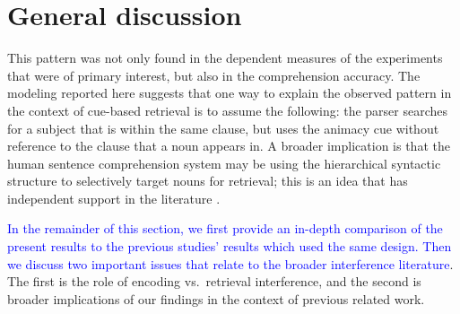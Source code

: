 \documentclass[a4paper, man, floatsintext]{apa7}
\begin{document}
\section{General discussion}

\label{only_this_design} This pattern was not only found in the dependent measures of the experiments that were of primary interest, but also in the comprehension accuracy. 
The modeling reported here suggests that one way to explain the observed pattern in the context of cue-based retrieval is to assume the following: the parser searches for a subject that is within the same clause, but uses the animacy cue without reference to the clause that a noun appears in. A broader implication is that the human sentence comprehension system may be using the hierarchical syntactic structure to selectively target nouns for retrieval; this is an idea that has independent support in the literature \citep[e.g.,][]{Sturt2003,dillon2013,yadav2021individual}.

\textcolor{blue}{In the remainder of this section, we first provide an in-depth comparison of the present results to the previous studies' results which used the same design. Then we discuss two important issues that relate to the broader interference literature}. The first is the role of encoding vs.\ retrieval interference, and the second is broader implications of our findings in the context of previous related work.
\end{document}
